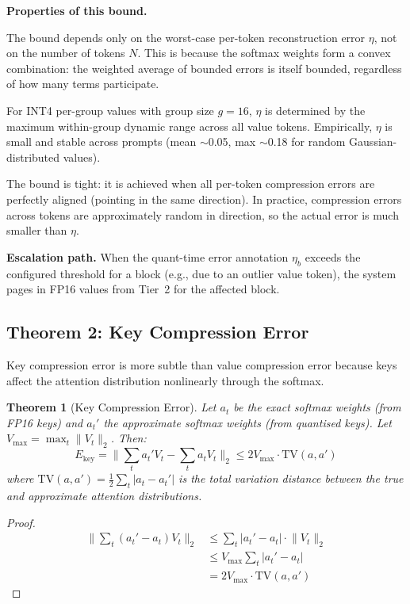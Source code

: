 \documentclass[10pt,twocolumn,a4paper]{article}
\newtheorem{theorem}{Theorem}[section]
\theoremstyle{definition}
\theoremstyle{remark}
\newcommand{\norm}[1]{\lVert #1 \rVert}
\begin{document}
\textbf{Properties of this bound.}

The bound depends only on the worst-case per-token reconstruction error $\eta$, not on the number of tokens $N$.  This is because the softmax weights form a convex combination: the weighted average of bounded errors is itself bounded, regardless of how many terms participate.

For INT4 per-group values with group size $g{=}16$, $\eta$ is determined by the maximum within-group dynamic range across all value tokens.  Empirically, $\eta$ is small and stable across prompts (mean $\sim$0.05, max $\sim$0.18 for random Gaussian-distributed values).

The bound is tight: it is achieved when all per-token compression errors are perfectly aligned (pointing in the same direction).  In practice, compression errors across tokens are approximately random in direction, so the actual error is much smaller than $\eta$.

\textbf{Escalation path.}  When the quant-time error annotation $\eta_b$ exceeds the configured threshold for a block (e.g., due to an outlier value token), the system pages in FP16 values from Tier~2 for the affected block.

\subsection{Theorem 2: Key Compression Error}
\label{sec:key_error}

Key compression error is more subtle than value compression error because keys affect the attention distribution nonlinearly through the softmax.

\begin{theorem}[Key Compression Error]
\label{thm:key}
Let $a_t$ be the exact softmax weights (from FP16 keys) and $a_t'$ the approximate softmax weights (from quantised keys).  Let $V_{\max} = \max_t \norm{V_t}_2$.  Then:
\begin{equation}
  E_{\mathrm{key}} = \norm{\sum_t a_t' V_t - \sum_t a_t V_t}_2 \leq 2 V_{\max} \cdot \mathrm{TV}(a, a')
\end{equation}
where $\mathrm{TV}(a, a') = \frac{1}{2}\sum_t |a_t - a_t'|$ is the total variation distance between the true and approximate attention distributions.
\end{theorem}

\begin{proof}
\begin{align*}
  \norm{\sum_t (a_t' - a_t) V_t}_2
    &\leq \sum_t |a_t' - a_t| \cdot \norm{V_t}_2 \\
    &\leq V_{\max} \sum_t |a_t' - a_t| \\
    &= 2 V_{\max} \cdot \mathrm{TV}(a, a')
\end{align*}
\end{proof}
\end{document}
